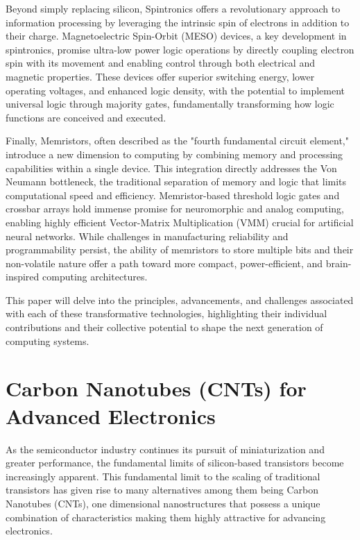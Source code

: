 \documentclass[sigconf]{acmart}
\begin{document}
Beyond simply replacing silicon, Spintronics offers a 
revolutionary approach to information processing by leveraging 
the intrinsic spin of electrons in addition to their charge. 
Magnetoelectric Spin-Orbit (MESO) devices, a key development in 
spintronics, promise ultra-low power logic operations by directly 
coupling electron spin with its movement and enabling control 
through both electrical and magnetic properties. These devices 
offer superior switching energy, lower operating voltages, and 
enhanced logic density, with the potential to implement universal 
logic through majority gates, fundamentally transforming how logic 
functions are conceived and executed.

Finally, Memristors, often described as the "fourth fundamental 
circuit element," introduce a new dimension to computing by 
combining memory and processing capabilities within a single 
device. This integration directly addresses the Von Neumann 
bottleneck, the traditional separation of memory and logic that 
limits computational speed and efficiency. Memristor-based 
threshold logic gates and crossbar arrays hold immense promise 
for neuromorphic and analog computing, enabling highly efficient 
Vector-Matrix Multiplication (VMM) crucial for artificial neural 
networks. While challenges in manufacturing reliability and 
programmability persist, the ability of memristors to store 
multiple bits and their non-volatile nature offer a path toward 
more compact, power-efficient, and brain-inspired computing 
architectures.

This paper will delve into the principles, advancements, and 
challenges associated with each of these transformative technologies, 
highlighting their individual contributions and their collective 
potential to shape the next generation of computing systems.

\section{Carbon Nanotubes (CNTs) for Advanced Electronics}
As the semiconductor industry continues its pursuit of miniaturization 
and greater performance, the fundamental limits of silicon-based 
transistors become increasingly apparent. This fundamental limit to 
the scaling of traditional transistors has given rise to many 
alternatives among them being Carbon Nanotubes (CNTs), one 
dimensional nanostructures that possess a unique combination of 
characteristics making them highly attractive for advancing 
electronics.
\end{document}

